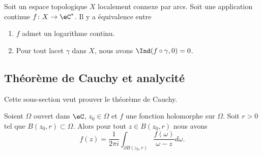 \begin{proposition}       \label{PROPooCFMFooXjlhfV}
	Soit un espace topologique \( X\) localement connexe par arcs. Soit une application continue \( f\colon X\to \eC^*\). Il y a équivalence entre
	\begin{enumerate}
		\item
		      \( f\) admet un logarithme continu.
		\item
		      Pour tout lacet \( \gamma\) dans \( X\), nous avons \( \Ind(f\circ\gamma,0)=0\).
	\end{enumerate}
\end{proposition}

\subsection{Théorème de Cauchy et analycité}

Cette sous-section veut prouver le théorème de Cauchy.


\begin{theorem}    \label{ThoUHztQe}
	Soient \( \Omega\) ouvert dans \( \eC\), \( z_0\in \Omega\) et \( f\) une fonction holomorphe sur \( \Omega\). Soit \( r>0\) tel que \( B(z_0,r)\subset \Omega\). Alors pour tout \( z\in B(z_0,r)\) nous avons
	\begin{equation}    \label{EqPzUABM}
		f(z)=\frac{1}{ 2\pi i }\int_{\partial B(z_0,r)}\frac{ f(\omega) }{ \omega-z }d\omega.
	\end{equation}
\end{theorem}

